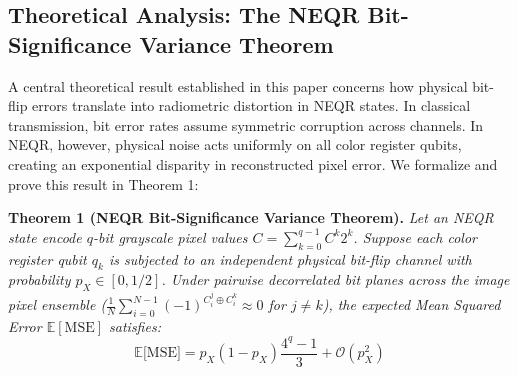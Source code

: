 \documentclass[12pt,onecolumn,draftclsnofoot]{IEEEtran}
\begin{document}
\subsection{Theoretical Analysis: The NEQR Bit-Significance Variance Theorem}
A central theoretical result established in this paper concerns how physical bit-flip errors translate into radiometric distortion in NEQR states. In classical transmission, bit error rates assume symmetric corruption across channels. In NEQR, however, physical noise acts uniformly on all color register qubits, creating an exponential disparity in reconstructed pixel error. We formalize and prove this result in Theorem 1:

\noindent\textbf{Theorem 1 (NEQR Bit-Significance Variance Theorem).} \textit{Let an NEQR state encode $q$-bit grayscale pixel values $C = \sum_{k=0}^{q-1} C^k 2^k$. Suppose each color register qubit $q_k$ is subjected to an independent physical bit-flip channel with probability $p_X \in [0, 1/2]$. Under pairwise decorrelated bit planes across the image pixel ensemble ($\frac{1}{N}\sum_{i=0}^{N-1} (-1)^{C_i^j \oplus C_i^k} \approx 0$ for $j \ne k$), the expected Mean Squared Error $\mathbb{E}[\text{MSE}]$ satisfies:}
\begin{equation}
\mathbb{E}\big[\text{MSE}\big] = p_X (1 - p_X) \frac{4^q - 1}{3} + \mathcal{O}(p_X^2)
\end{equation}
\end{document}
